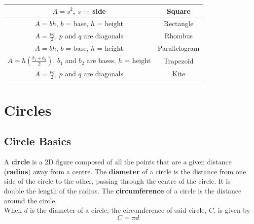 \documentclass{article}
\begin{document}
            \begin{center}
                \begin{tabular} {|c|c|}
                    \hline
                    $A=s^2$, $s$ = side & Square \\
                    \hline
                    $A=bh$, $b$ = base, $h$ = height & Rectangle \\
                    \hline
                    $A=\frac{pq}{2}$, $p$ and $q$ are diagonals & Rhombus \\
                    \hline
                    $A=bh$, $b$ = base, $h$ = height & Parallelogram \\
                    \hline
                    $A=h(\frac{b_1+b_2}{2})$, $b_1$ and $b_2$ are bases, $h$ = height & Trapezoid \\
                    \hline
                    $A=\frac{pq}{2}$, $p$ and $q$ are diagonals & Kite \\
                    \hline
                \end{tabular}
            \end{center}

    \pagebreak

    \section{Circles}

        \subsection{Circle Basics}
            A \textbf{circle} is a 2D figure composed of all the points that are a given distance
            (\textbf{radius}) away from a centre. The \textbf{diameter} of a circle is the distance
            from one side of the circle to the other, passing through the centre of the circle.
            It is double the length of the radius. The \textbf{circumference} of a circle is the
            distance around the circle. \\

            \noindent When $d$ is the diameter of a circle, the circumference of said circle, $C$,
            is given by \\

            \begin{equation*}
                C = \pi d
            \end{equation*}
\end{document}
